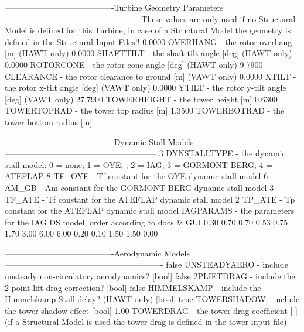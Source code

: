 \begin{cfgcode}
----------------------------------------Turbine Geometry Parameters-------------------------------------------------
These values are only used if no Structural Model is defined for this Turbine, in case of a Structural Model the geometry is defined in the Structural Input Files!!
0.0000                                             OVERHANG           - the rotor overhang [m] (HAWT only)
0.0000                                             SHAFTTILT          - the shaft tilt angle [deg] (HAWT only)
0.0000                                             ROTORCONE          - the rotor cone angle [deg] (HAWT only)
9.7900                                             CLEARANCE          - the rotor clearance to ground [m] (VAWT only)
0.0000                                             XTILT              - the rotor x-tilt angle [deg] (VAWT only)
0.0000                                             YTILT              - the rotor y-tilt angle [deg] (VAWT only)
27.7900                                            TOWERHEIGHT        - the tower height [m]
0.6300                                             TOWERTOPRAD        - the tower top radius [m]
1.3500                                             TOWERBOTRAD        - the tower bottom radius [m]

----------------------------------------Dynamic Stall Models--------------------------------------------------------
3                                                  DYNSTALLTYPE       - the dynamic stall model: 0 = none; 1 = OYE; ; 2 = IAG; 3 = GORMONT-BERG; 4 = ATEFLAP
8                                                  TF_OYE             - Tf constant for the OYE dynamic stall model
6                                                  AM_GB              - Am constant for the GORMONT-BERG dynamic stall model
3                                                  TF_ATE             - Tf constant for the ATEFLAP dynamic stall model
2                                                  TP_ATE             - Tp constant for the ATEFLAP dynamic stall model
IAGPARAMS           - the parameters for the IAG DS model, order according to docs & GUI
0.30 0.70 0.70 0.53 0.75 1.70 3.00 6.00 6.00 0.20 0.10 1.50 1.50 0.00 

----------------------------------------Aerodynamic Models----------------------------------------------------------
false                                              UNSTEADYAERO       - include unsteady non-circulatory aerodynamics? [bool]
false                                              2PLIFTDRAG         - include the 2 point lift drag correction? [bool]
false                                              HIMMELSKAMP        - include the Himmelskamp Stall delay? (HAWT only) [bool]
true                                               TOWERSHADOW        - include the tower shadow effect [bool]
1.00                                               TOWERDRAG          - the tower drag coefficient [-] (if a Structural Model is used the tower drag is defined in the tower input file)


\end{cfgcode}
